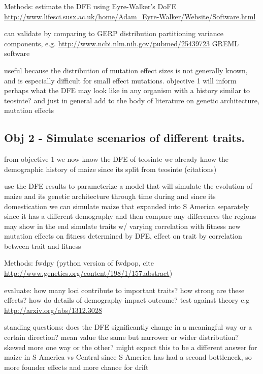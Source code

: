 \documentclass[10pt, letterpaper]{article}
\newcommand{\jri}[1]{\todo[size=\scriptsize, color=red]{#1}}
\newcommand{\kjg}[1]{\todo[size=\scriptsize, color=blue]{#1}}
\begin{document}
	Methods: estimate the DFE using Eyre-Walker's DoFE \url{http://www.lifesci.susx.ac.uk/home/Adam_Eyre-Walker/Website/Software.html}
	
\kjg{this part prob not in proposal:}
	can validate by comparing to
		GERP distribution
		partitioning variance components, e.g. \url{http://www.ncbi.nlm.nih.gov/pubmed/25439723}
		GREML software
				

	useful because the distribution of mutation effect sizes is not generally known, and is especially difficult for small effect mutations.
	objective 1 will inform perhaps what the DFE may look like in any organism with a history similar to teosinte? 
	and just in general add to the body of literature on genetic architecture, mutation effects

	
\subsection{Obj 2 - Simulate scenarios of different traits.}
	
	from objective 1 we now know the DFE of teosinte
	we already know the demographic history of maize since its split from teosinte (citations)
	
	use the DFE results to parameterize a model that will simulate the evolution of maize and its genetic architecture through time during and since its domestication
	we can simulate maize that expanded into S America separately since it has a different demography and then compare any differences the regions may show in the end
		simulate traits w/ varying correlation with fitness
		new mutation effects on fitness determined by DFE, effect on trait by correlation between trait and fitness
	
	Methods: fwdpy (python version of fwdpop, cite \url{http://www.genetics.org/content/198/1/157.abstract})
	
	evaluate:
		how many loci contribute to important traits?
		how strong are these effects?
		how do details of demography impact outcome?
		test against theory e.g \url{http://arxiv.org/abs/1312.3028}
	
	standing questions:
		does the DFE significantly change in a meaningful way or a certain direction?
			mean value the same but narrower or wider distribution?
			skewed more one way or the other?
		might expect this to be a different answer for maize in S America vs Central since S America has had a second bottleneck, so more founder effects and more chance for drift
	
\end{document}
